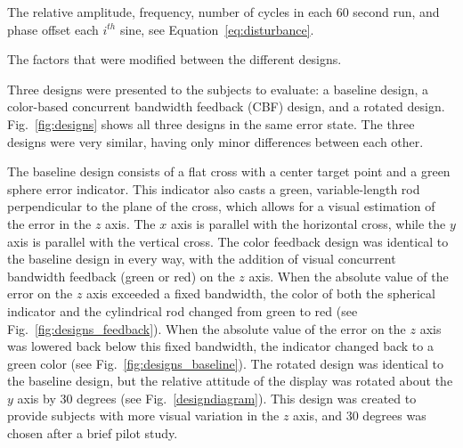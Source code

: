 \begin{table}[tb]
    \centering
    \caption[Disturbance force characteristics]{The relative amplitude, frequency, number of cycles in each 60 second run, and phase offset each $i^{th}$ sine, see Equation~\ref{eq:disturbance}.}
    \label{sine-table}
\end{table}

\begin{table}[tb]
    \centering
    \caption[The factors that were modified between the different designs]{The factors that were modified between the different designs.}
    \label{tab:designs}
\end{table}

Three designs were presented to the subjects to evaluate: a baseline design, a color-based concurrent bandwidth feedback (CBF) design, and a rotated design.
Fig.~\ref{fig:designs} shows all three designs in the same error state.
The three designs were very similar, having only minor differences between each other.

The baseline design consists of a flat cross with a center target point and a green sphere error indicator.
This indicator also casts a green, variable-length rod perpendicular to the plane of the cross, which allows for a visual estimation of the error in the $z$ axis.
The $x$ axis is parallel with the horizontal cross, while the $y$ axis is parallel with the vertical cross.
The color feedback design was identical to the baseline design in every way, with the addition of visual concurrent bandwidth feedback (green or red) on the $z$ axis.
When the absolute value of the error on the $z$ axis exceeded a fixed bandwidth, the color of both the spherical indicator and the cylindrical rod changed from green to red (see Fig.~\ref{fig:designs_feedback}).
When the absolute value of the error on the $z$ axis was lowered back below this fixed bandwidth, the indicator changed back to a green color (see Fig.~\ref{fig:designs_baseline}).
The rotated design was identical to the baseline design, but the relative attitude of the display was rotated about the $y$ axis by 30 degrees (see Fig.~\ref{designdiagram}).
This design was created to provide subjects with more visual variation in the $z$ axis, and 30 degrees was chosen after a brief pilot study.

